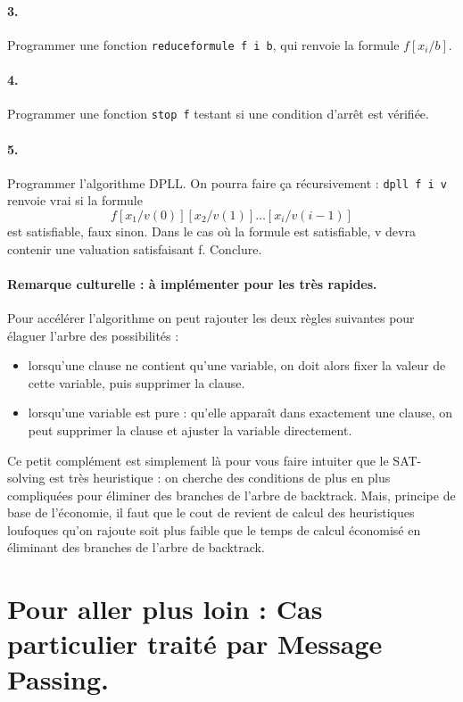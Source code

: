 \documentclass[10pt,a4paper]{article}
\begin{document}
\paragraph{3.} Programmer une fonction \texttt{reduceformule f i b}, qui renvoie la formule $f[x_i/b]$.

\paragraph{4.} Programmer une fonction \texttt{stop f} testant si une condition d'arrêt est vérifiée.

\paragraph{5.} Programmer l'algorithme DPLL. On pourra faire ça récursivement : \texttt{dpll f i v} renvoie vrai si la formule $$f[x_1/v(0)][x_2/v(1)]\dots[x_i/v(i-1)]$$ est satisfiable, faux sinon. Dans le cas où la formule est satisfiable, v devra contenir une valuation satisfaisant f. Conclure.

\paragraph{Remarque culturelle : à implémenter pour les très rapides.} Pour accélérer l'algorithme on peut rajouter les deux règles suivantes pour élaguer l'arbre des possibilités :
\begin{itemize}
\item lorsqu'une clause ne contient qu'une variable, on doit alors fixer la valeur de cette variable, puis supprimer la clause.
\item lorsqu'une variable est pure : qu'elle apparaît dans exactement une clause, on peut supprimer la clause et ajuster la variable directement.
\end{itemize}
Ce petit complément est simplement là pour vous faire intuiter que le SAT-solving est très heuristique : on cherche des conditions de plus en plus compliquées pour éliminer des branches de l'arbre de backtrack. Mais, principe de base de l'économie, il faut que le cout de revient de calcul des heuristiques loufoques qu'on rajoute soit plus faible que le temps de calcul économisé en éliminant des branches de l'arbre de backtrack.

\section{Pour aller plus loin : Cas particulier traité par Message Passing.}
\end{document}
